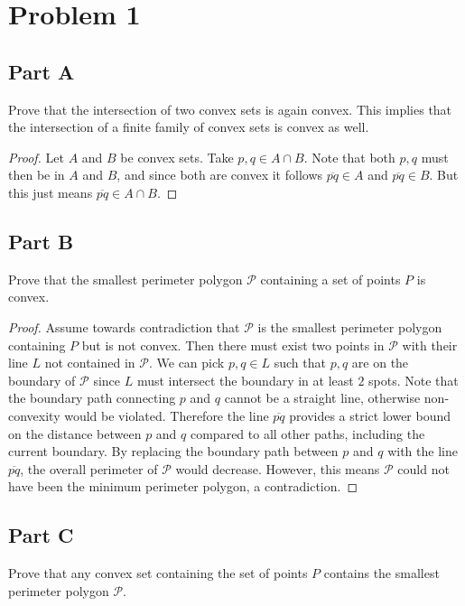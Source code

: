 \documentclass{eeleyes}
\begin{document}
\section*{Problem 1}

\begin{problem}
    \subsection*{Part A}
    Prove that the intersection of two convex sets is again convex. This implies that the intersection of a finite family of convex sets is convex as well.
\end{problem}

\begin{proof}
    Let $A$ and $B$ be convex sets. Take $p,q \in A \cap B$. Note that both $p,q$ must then be in $A$ and $B$, and since both are convex it follows $\overline{pq} \in A$ and $\overline{pq} \in B$. But this just means $\overline{pq} \in A \cap B$.
\end{proof}

\begin{problem}
    \subsection*{Part B}
    Prove that the smallest perimeter polygon $\mathcal{P}$ containing a set of points $P$ is convex.
\end{problem}

\begin{proof}
    Assume towards contradiction that $\mathcal{P}$ is the smallest perimeter polygon containing $P$ but is not convex. Then there must exist two points in $\mathcal{P}$ with their line $L$ not contained in $\mathcal{P}$. We can pick $p,q \in L$ such that $p,q$ are on the boundary of $\mathcal{P}$ since $L$ must intersect the boundary in at least $2$ spots. Note that the boundary path connecting $p$ and $q$ cannot be a straight line, otherwise non-convexity would be violated. Therefore the line $\overline{pq}$ provides a strict lower bound on the distance between $p$ and $q$ compared to all other paths, including the current boundary. By replacing the boundary path between $p$ and $q$ with the line $\overline{pq}$, the overall perimeter of $\mathcal{P}$ would decrease. However, this means $\mathcal{P}$ could not have been the minimum perimeter polygon, a contradiction.
\end{proof}

\begin{problem}
    \subsection*{Part C}
    Prove that any convex set containing the set of points $P$ contains the smallest perimeter polygon $\mathcal{P}$.
\end{problem}
\end{document}
